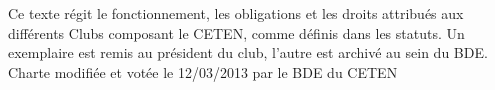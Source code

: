 \documentclass{article} %
\begin{document}
\begin{titlepage}
		\vfill
		\begin{center}
			{\light Ce texte régit le fonctionnement, les obligations et les
			droits attribués aux différents Clubs composant le CETEN, comme
			définis dans les statuts. Un exemplaire est remis au président du
			club, l’autre est archivé au sein du BDE. \\
			Charte modifiée et votée le 12/03/2013 par le BDE du CETEN}
		\end{center}
	\end{titlepage}

	
	\tableofcontents
	\clearpage


\end{document}
